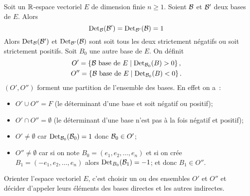 Soit un \(\mathbb{R}\)-espace vectoriel \(E\) de dimension finie \(n\geqslant
1\). Soient \(\mathcal{B}\) et \(\mathcal{B}'\) deux bases de \(E\). Alors
\begin{equation}
  \operatorname{Det}_{\mathcal{B}}(\mathcal{B}') =  \operatorname{Det}_{\mathcal{B}'}(\mathcal{B}) = 1
\end{equation}
Alors \(\operatorname{Det}_{\mathcal{B}}(\mathcal{B}')\) et \(\operatorname{Det}_{\mathcal{B}'}(\mathcal{B})\) sont soit tous les deux
strictement négatifs ou soit strictement positifs. Soit \(B_0\) une
autre base de \(E\). On définit
\begin{gather}
  O'=\left\{\mathcal{B} \text{~base de~} E\mathrel{}\middle|\mathrel{}\operatorname{Det}_{\mathcal{B}_0}(B)>0\right\},\\
  O''=\left\{\mathcal{B} \text{~base de~} E\mathrel{}\middle|\mathrel{}\operatorname{Det}_{\mathcal{B}_0}(B)<0\right\}.
\end{gather}
\((O',O'')\) forment une partition de l'ensemble des bases. En effet on
a~:
\begin{itemize}
  \item \(O' \cup O'' = F\) (le déterminant d'une base et soit négatif
    ou positif);
  \item \(O' \cap O'' = \emptyset\) (le déterminant d'une base n'est pas
    à la fois négatif et positif);
  \item \(O' \neq \emptyset\) car \(\operatorname{Det}_{\mathcal{B}_0}(\mathcal{B}_0)=1\) donc \(\mathcal{B}_0
    \in O'\);
  \item \(O'' \neq \emptyset\)  car si on note \(B_0=(e_1, e_2, \ldots,
    e_n)\) et si on crée \(B_1 = (-e_1, e_2, \ldots, e_n)\) alors
    \(\operatorname{Det}_{B_0}(\mathcal{B}_1) = -1\); et donc \(B_1 \in O''\).
\end{itemize}

\begin{defdef}
  Orienter l'espace vectoriel \(E\), c'est choisir un ou des ensembles
  \(O'\) et \(O''\) et décider d'appeler leurs éléments des bases
  directes et les autres indirectes.
\end{defdef}
